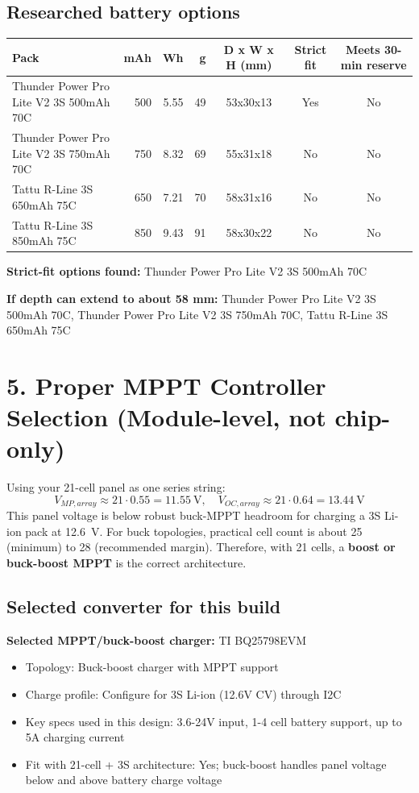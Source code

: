 \documentclass[11pt]{article}
\begin{document}
\subsection*{Researched battery options}
\begin{longtable}{p{5.8cm} r r r c c c}
\toprule
Pack & mAh & Wh & g & D x W x H (mm) & Strict fit & Meets 30-min reserve \\
\midrule
\endhead
Thunder Power Pro Lite V2 3S 500mAh 70C & 500 & 5.55 & 49 & 53x30x13 & Yes & No \\
Thunder Power Pro Lite V2 3S 750mAh 70C & 750 & 8.32 & 69 & 55x31x18 & No & No \\
Tattu R-Line 3S 650mAh 75C & 650 & 7.21 & 70 & 58x31x16 & No & No \\
Tattu R-Line 3S 850mAh 75C & 850 & 9.43 & 91 & 58x30x22 & No & No \\
\bottomrule
\end{longtable}

\textbf{Strict-fit options found:} Thunder Power Pro Lite V2 3S 500mAh 70C

\textbf{If depth can extend to about 58 mm:} Thunder Power Pro Lite V2 3S 500mAh 70C, Thunder Power Pro Lite V2 3S 750mAh 70C, Tattu R-Line 3S 650mAh 75C

\section*{5. Proper MPPT Controller Selection (Module-level, not chip-only)}
Using your 21-cell panel as one series string:
\[
V_{MP,array} \approx 21 \cdot 0.55 = 11.55\ \mathrm{V},\quad
V_{OC,array} \approx 21 \cdot 0.64 = 13.44\ \mathrm{V}
\]
This panel voltage is below robust buck-MPPT headroom for charging a 3S Li-ion pack at \SI{12.6}{V}.
For buck topologies, practical cell count is about 25 (minimum) to 28 (recommended margin).
Therefore, with 21 cells, a \textbf{boost or buck-boost MPPT} is the correct architecture.

\subsection*{Selected converter for this build}
\textbf{Selected MPPT/buck-boost charger:} TI BQ25798EVM
\begin{itemize}
  \item Topology: Buck-boost charger with MPPT support
  \item Charge profile: Configure for 3S Li-ion (12.6V CV) through I2C
  \item Key specs used in this design: 3.6-24V input, 1-4 cell battery support, up to 5A charging current
  \item Fit with 21-cell + 3S architecture: Yes; buck-boost handles panel voltage below and above battery charge voltage
\end{itemize}
\end{document}
